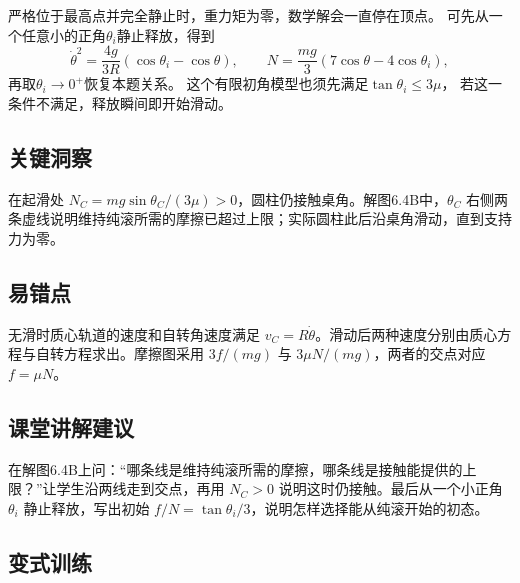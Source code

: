 \documentclass[UTF8,fontset=fandol,a4paper,11pt]{ctexart}
\begin{document}
严格位于最高点并完全静止时，重力矩为零，数学解会一直停在顶点。
可先从一个任意小的正角$\theta_i$静止释放，得到
\[
\dot\theta^2=\frac{4g}{3R}(\cos\theta_i-\cos\theta),
\qquad
N=\frac{mg}{3}(7\cos\theta-4\cos\theta_i),
\]
再取$\theta_i\to0^+$恢复本题关系。
这个有限初角模型也须先满足$\tan\theta_i\leq3\mu$，
若这一条件不满足，释放瞬间即开始滑动。




\subsection*{关键洞察}

在起滑处 $N_C=mg\sin\theta_C/(3\mu)>0$，圆柱仍接触桌角。解图6.4B中，$\theta_C$ 右侧两条虚线说明维持纯滚所需的摩擦已超过上限；实际圆柱此后沿桌角滑动，直到支持力为零。



\subsection*{易错点}

无滑时质心轨道的速度和自转角速度满足 $v_C=R\dot\theta$。滑动后两种速度分别由质心方程与自转方程求出。摩擦图采用 $3f/(mg)$ 与 $3\mu N/(mg)$，两者的交点对应 $f=\mu N$。



\subsection*{课堂讲解建议}

在解图6.4B上问：“哪条线是维持纯滚所需的摩擦，哪条线是接触能提供的上限？”让学生沿两线走到交点，再用 $N_C>0$ 说明这时仍接触。最后从一个小正角 $\theta_i$ 静止释放，写出初始 $f/N=\tan\theta_i/3$，说明怎样选择能从纯滚开始的初态。




\subsection*{变式训练}
\end{document}
